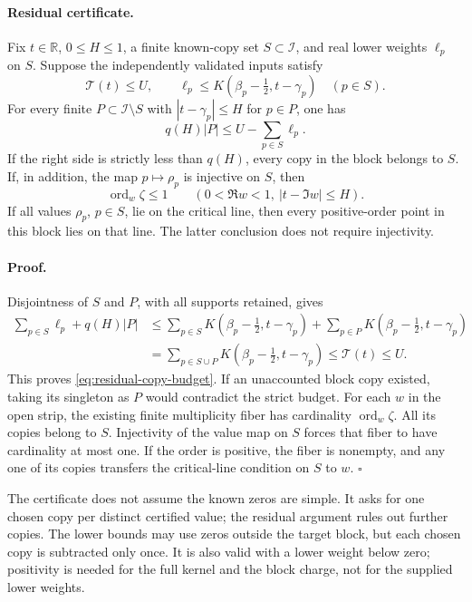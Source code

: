 \paragraph{Residual certificate.}
Fix \(t\in\mathbb R\), \(0\le H\le1\), a finite known-copy set
\(S\subset\mathcal I\), and real lower weights \(\ell_p\) on \(S\).
Suppose the independently validated inputs satisfy
\[
 \mathcal T(t)\le U,\qquad
 \ell_p\le K(\beta_p-\tfrac12,t-\gamma_p)\quad(p\in S).
\]
For every finite \(P\subset\mathcal I\setminus S\) with
\(|t-\gamma_p|\le H\) for \(p\in P\), one has
\begin{equation}
 q(H)|P|\le U-\sum_{p\in S}\ell_p.
 \label{eq:residual-copy-budget}
\end{equation}
If the right side is strictly less than \(q(H)\), every copy in the
block belongs to \(S\).  If, in addition, the map
\(p\mapsto\rho_p\) is injective on \(S\), then
\[
 \operatorname{ord}_w\zeta\le1
 \qquad(0<\Re w<1,\ |t-\Im w|\le H).
\]
If all values \(\rho_p\), \(p\in S\), lie on the critical line,
then every positive-order point in this block lies on that line.
The latter conclusion does not require injectivity.

\paragraph{Proof.}
Disjointness of \(S\) and \(P\), with all supports retained, gives
\[
 \begin{aligned}
 \sum_{p\in S}\ell_p+q(H)|P|
 &\le\sum_{p\in S}K(\beta_p-\tfrac12,t-\gamma_p)
      +\sum_{p\in P}K(\beta_p-\tfrac12,t-\gamma_p)\\
 &=\sum_{p\in S\cup P}K(\beta_p-\tfrac12,t-\gamma_p)
 \le\mathcal T(t)\le U.
 \end{aligned}
\]
This proves \eqref{eq:residual-copy-budget}.  If an unaccounted block
copy existed, taking its singleton as \(P\) would contradict the strict
budget.  For each \(w\) in the open strip, the existing finite
multiplicity fiber has cardinality \(\operatorname{ord}_w\zeta\).
All its copies belong to \(S\).  Injectivity of the value map on \(S\)
forces that fiber to have cardinality at most one.  If the order is
positive, the fiber is nonempty, and any one of its copies transfers
the critical-line condition on \(S\) to \(w\). \(\square\)

The certificate does not assume the known zeros are simple.  It asks for
one chosen copy per distinct certified value; the residual argument rules
out further copies.  The lower bounds may use zeros outside the target
block, but each chosen copy is subtracted only once.  It is also valid
with a lower weight below zero; positivity is needed for the full kernel
and the block charge, not for the supplied lower weights.

